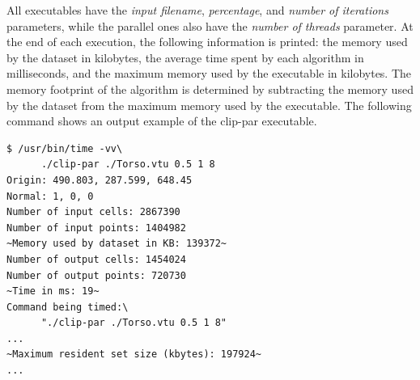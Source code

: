 \documentclass{egpubl}
\begin{document}
All executables have the \textit{input filename}, \textit{percentage}, and \textit{number of iterations} parameters, while the parallel ones also have the \textit{number of threads} parameter. At the end of each execution, the following information is printed: the memory used by the dataset in kilobytes, the average time spent by each algorithm in milliseconds, and the maximum memory used by the executable in kilobytes. The memory footprint of the algorithm is determined by subtracting the memory used by the dataset from the maximum memory used by the executable. The following command shows an output example of the clip-par executable.


\begin{lstlisting}[language=BashOutput]
$ /usr/bin/time -vv\
      ./clip-par ./Torso.vtu 0.5 1 8
Origin: 490.803, 287.599, 648.45
Normal: 1, 0, 0
Number of input cells: 2867390
Number of input points: 1404982
~Memory used by dataset in KB: 139372~
Number of output cells: 1454024
Number of output points: 720730
~Time in ms: 19~
Command being timed:\
      "./clip-par ./Torso.vtu 0.5 1 8"
...
~Maximum resident set size (kbytes): 197924~
...
\end{lstlisting}
\end{document}
